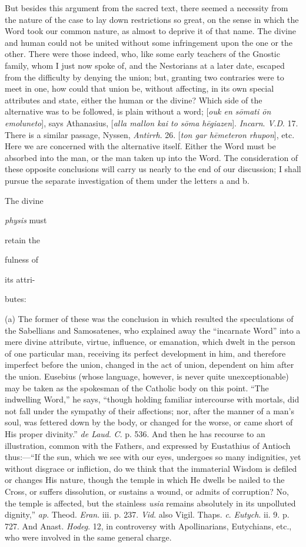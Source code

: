 But
besides this argument from the sacred text, there seemed a
necessity from the nature of the case to lay down restrictions
so great, on the sense in which the Word took our common
nature, as almost to deprive it of that name. The divine and
human could not be united without some infringement upon the
one or the other. There were those indeed, who, like
some early teachers of the Gnostic family, whom I just now
spoke of, and the Nestorians at a later date, escaped from the
difficulty by denying the union; but, granting two contraries
were to meet in one, how could that union be, without
affecting, in its own special attributes and state, either the
human or the divine? Which side of the alternative was to be
followed, is plain without a word; [\emph{ouk en s\={o}mati \={o}n
emoluneto}], says Athanasius, [\emph{alla mallon kai to s\={o}ma
h\={e}giazen}]. \emph{Incarn}. \emph{V}.\emph{D}. 17.
There is a similar passage, Nyssen, \emph{Antirrh}. 26. [\emph{ton
gar h\={e}meteron rhupon}], etc. Here we are concerned
with the alternative itself. Either the Word must be absorbed
into the man, or the man taken up into the Word. The
consideration of these opposite conclusions will carry us
nearly to the end of our discussion; I shall pursue the
separate investigation of them under the letters a and b.

The divine

\emph{physis} must

retain the

fulness of

its attri-

butes:

(a) The former of these
was the conclusion in which resulted the speculations of the
Sabellians and Samosatenes, who explained away the ``incarnate Word'' into a mere divine attribute, virtue,
influence, or emanation, which dwelt in the person of one
particular man, receiving its perfect development in him, and
therefore imperfect before the union, changed in the act of
union, dependent on him after the union. Eusebius (whose
language, however, is never quite unexceptionable) may be
taken as the spokesman of the Catholic body on this point. ``The indwelling Word,'' he says,
``though holding familiar
intercourse with mortals, did not fall under the sympathy of
their affections; nor, after the manner of a man's
soul, was fettered down by the body, or changed for the worse,
or came short of His proper divinity.'' \emph{de Laud}. \emph{C}.
p. 536. And then he has recourse to an illustration, common
with the Fathers, and expressed by Eustathius of Antioch
thus:—``If the sun, which we see with our eyes, undergoes
so many indignities, yet without disgrace or infliction, do we
think that the immaterial Wisdom is defiled or changes His
nature, though the temple in which He dwells be nailed to the
Cross, or suffers dissolution, or sustains a wound, or admits
of corruption? No, the temple is affected, but the stainless \emph{usia}
remains absolutely in its unpolluted dignity,'' \emph{ap}.
Theod. \emph{Eran}. iii. p. 237. \emph{Vid}. also Vigil. Thaps.
\emph{c}. \emph{Eutych}. ii. 9. p. 727. And Anast. \emph{Hodeg}.
12, in controversy with Apollinarians, Eutychians, etc., who
were involved in the same general charge.

